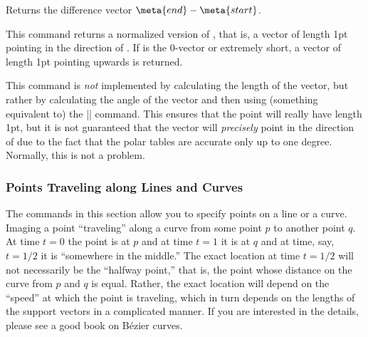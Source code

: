 \begin{command}{\pgfpointdiff{}}
  Returns the difference vector $\meta{end} - \meta{start}$.
\begin{codeexample}[]
\end{codeexample}
\end{command}


\begin{command}{\pgfpointnormalised{}}
  This command returns a normalized version of , that is,
  a vector of length 1pt pointing in the direction of . If
   is the $0$-vector or extremely short, a vector of
  length 1pt pointing upwards is returned.

  This command is \emph{not} implemented by calculating the length of
  the vector, but rather by calculating the angle of the vector and
  then using (something equivalent to) the |\pgfpointpolar|
  command. This ensures that the point will really have length 1pt,
  but it is not guaranteed that the vector will \emph{precisely} point
  in the direction of  due to the fact that the polar
  tables are accurate only up to one degree. Normally, this is not a
  problem.
\begin{codeexample}[]
\end{codeexample}
\end{command}


\subsubsection{Points Traveling along Lines and Curves}

\label{section-pointsattime}

The commands in this section allow you to specify points on a line or
a curve. Imaging a point ``traveling'' along a curve from some point
$p$ to another point $q$. At time $t=0$ the point is at $p$ and at
time $t=1$ it is at $q$ and at time, say, $t=1/2$ it is ``somewhere in
the middle.'' The exact location at time $t=1/2$ will not necessarily
be the ``halfway point,'' that is, the point whose distance on the
curve from $p$ and $q$ is equal. Rather, the exact location will
depend on the ``speed'' at which the point is traveling, which in
turn depends on the lengths of the support vectors in a complicated
manner. If you are interested in the details, please see a good book
on B\'ezier curves.



